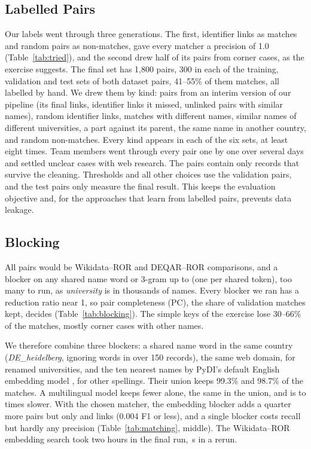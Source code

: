 \documentclass[runningheads,a4paper]{llncs}
\begin{document}
\subsection{Labelled Pairs}\label{sec:labels}
Our labels went through three generations. The first, identifier links as matches and random pairs as
non-matches, gave every matcher a precision of 1.0 (Table~\ref{tab:tried}), and the second drew half of
its pairs from corner cases, as the exercise suggests. The final set has 1,800 pairs, 300 in
each of the training, validation and test sets of both dataset pairs, 41--55\% of them matches, all labelled
by hand. We drew them by kind: pairs from an interim version of our pipeline (its final links, identifier links it missed, unlinked
pairs with similar names), random identifier links, matches with different names, similar names of
different universities, a part against its parent, the same name in another country, and random
non-matches. Every kind appears in each of the six sets, at least eight times. Team members went through every pair one by one over several days and
settled unclear cases with web research. The pairs contain only records that survive the
cleaning. Thresholds and all other choices use the validation pairs, and the test pairs only
measure the final result. This keeps the evaluation objective and, for the approaches that learn
from labelled pairs, prevents data leakage.

\subsection{Blocking}\label{sec:blocking}

All pairs would be \allPairsWr{} Wikidata--ROR and \allPairsDr{} DEQAR--ROR comparisons, and a blocker
on any shared name word or 3-gram up to \tokenPairsMax{} (one per shared token), too many to run, as
\emph{university} is in thousands of names. Every blocker we ran has a reduction ratio near 1, so pair
completeness (PC), the share of validation matches kept, decides (Table~\ref{tab:blocking}). The simple
keys of the exercise lose 30--66\% of the matches, mostly corner cases with other names.

We therefore combine three blockers: a shared name word in the same country (\emph{DE\_heidelberg},
ignoring words in over 150 records), the same web domain, for renamed universities, and the ten nearest
names by PyDI's default English embedding model \cite{allminilm2021}, for other spellings. Their union keeps 99.3\% and 98.7\% of the matches. A multilingual model
\cite{reimers2020multilingual} keeps fewer alone, the same in the union, and is \mlSlowMin{} to
\mlSlowMax{} times slower. With the chosen matcher, the embedding
blocker adds a quarter more pairs but only \wrEmbLinks{} and \drEmbLinks{} links (0.004 F1 or less),
and a single blocker costs recall but hardly any precision (Table~\ref{tab:matching}, middle). The
Wikidata--ROR embedding search took two hours in the final run, \embRerunWr{}\,s in a rerun.
\end{document}
